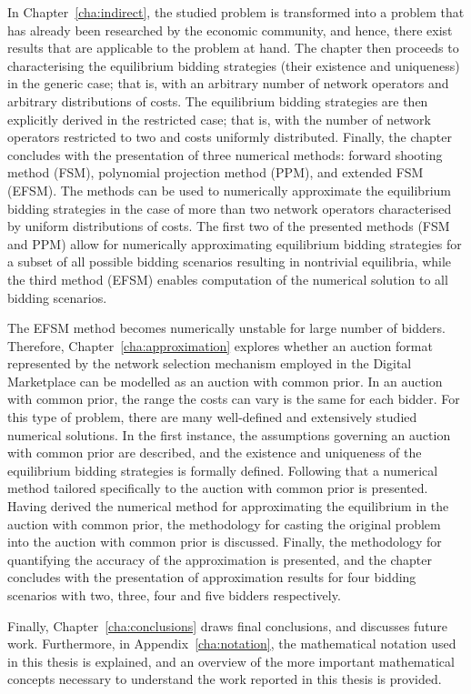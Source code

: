 In Chapter~\ref{cha:indirect}, the studied problem is transformed into a problem that has already been researched by the economic community, and hence, there exist results that are applicable to the problem at hand. The chapter then proceeds to characterising the equilibrium bidding strategies (their existence and uniqueness) in the generic case; that is, with an arbitrary number of network operators and arbitrary distributions of costs. The equilibrium bidding strategies are then explicitly derived in the restricted case; that is, with the number of network operators restricted to two and costs uniformly distributed. Finally, the chapter concludes with the presentation of three numerical methods: forward shooting method (FSM), polynomial projection method (PPM), and extended FSM (EFSM). The methods can be used to numerically approximate the equilibrium bidding strategies in the case of more than two network operators characterised by uniform distributions of costs. The first two of the presented methods (FSM and PPM) allow for numerically approximating equilibrium bidding strategies for a subset of all possible bidding scenarios resulting in nontrivial equilibria, while the third method (EFSM) enables computation of the numerical solution to all bidding scenarios.

The EFSM method becomes numerically unstable for large number of bidders. Therefore, Chapter~\ref{cha:approximation} explores whether an auction format represented by the network selection mechanism employed in the Digital Marketplace can be modelled as an auction with common prior. In an auction with common prior, the range the costs can vary is the same for each bidder. For this type of problem, there are many well-defined and extensively studied numerical solutions. In the first instance, the assumptions governing an auction with common prior are described, and the existence and uniqueness of the equilibrium bidding strategies is formally defined. Following that a numerical method tailored specifically to the auction with common prior is presented. Having derived the numerical method for approximating the equilibrium in the auction with common prior, the methodology for casting the original problem into the auction with common prior is discussed. Finally, the methodology for quantifying the accuracy of the approximation is presented, and the chapter concludes with the presentation of approximation results for four bidding scenarios with two, three, four and five bidders respectively.

Finally, Chapter~\ref{cha:conclusions} draws final conclusions, and discusses future work. Furthermore, in Appendix~\ref{cha:notation}, the mathematical notation used in this thesis is explained, and an overview of the more important mathematical concepts necessary to understand the work reported in this thesis is provided.

